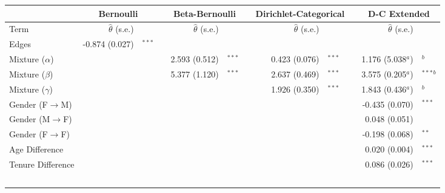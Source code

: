 \documentclass[11pt]{article}
\begin{document}




\begin{sidewaystable}
\begin{center}
\begin{tabular}{lrlcrlcrlcrl}
\hline\hline 
                   & \multicolumn{2}{c}{Bernoulli} & & \multicolumn{2}{c}{Beta-Bernoulli} & & \multicolumn{2}{c}{Dirichlet-Categorical} & & \multicolumn{2}{c}{D-C Extended} \\ \hline
Term               & $\hat{\theta}$ (s.e.) & & & $\hat{\theta}$ (s.e.) & & & $\hat{\theta}$ (s.e.) & & & $\hat{\theta}$ (s.e.) &\\ \hline
Edges              & -0.874 (0.027)&$^{***}$ & &               &      & &                 &      & &  & \\   
Mixture ($\alpha$) &               &      & & 2.593 (0.512) &$^{***}$ & & 0.423 (0.076) &$^{***}$ & & 1.176 (5.038$^a$) &$^b$ \\   
Mixture ($\beta$)  &               &      & & 5.377 (1.120) &$^{***}$ & & 2.637 (0.469) &$^{***}$ & &  3.575 (0.205$^a$) &$^{***}$$^b$\\
Mixture ($\gamma$) &               &      & &               &      & & 1.926 (0.350) &$^{***}$ & & 1.843 (0.436$^a$) &$^b$\\
Gender (F$\to$M)   &               &      & &               &      & &               &      & & -0.435 (0.070) &$^{***}$\\
Gender (M$\to$F)   &               &      & &               &      & &               &      & &  0.048 (0.051) &\\
Gender (F$\to$F)   &               &      & &               &      & &               &      & & -0.198 (0.068) &$^{**}$\\
Age Difference     &               &      & &               &      & &               &      & &  0.020 (0.004) &$^{***}$\\
Tenure Difference  &               &      & &               &      & &               &      & &  0.086 (0.026) &$^{***}$\\
$$
\end{tabular}
\end{center}
\end{sidewaystable}
\end{document}
